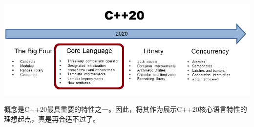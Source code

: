 
\begin{center}
\includegraphics[width=1.0\textwidth]{content/3/chapter4/images/1.png}\\
\end{center}

概念是C++20最具重要的特性之一。因此，将其作为展示C++20核心语言特性的理想起点，真是再合适不过了。
